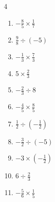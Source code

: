 \begin{multicols}{4}
\begin{enumerate}

\columnbreak %

\resetques

  \item $\displaystyle -\frac{8}{5}\times{}\frac{1}{7}$


  \item $\displaystyle \frac{9}{8}\div{}\left(-5\right)$


  \item $\displaystyle -\frac{1}{3}\times{}\frac{7}{3}$


  \item $\displaystyle 5\times{}\frac{2}{3}$


  \item $\displaystyle -\frac{2}{3}\div{}8$


  \item $\displaystyle -\frac{4}{5}\times{}\frac{8}{5}$


  \item $\displaystyle \frac{1}{2}\div{}\left(-\frac{1}{2}\right)$

        \phantom{$\displaystyle =-1$}

  \item $\displaystyle -\frac{3}{2}\div{}\left(-5\right)$


  \item $\displaystyle -3\times{}\left(-\frac{1}{2}\right)$


  \item $\displaystyle 6\div{}\frac{2}{3}$

        \phantom{$\displaystyle =9$}

\columnbreak %

  \item $\displaystyle -\frac{5}{6}\times{}\frac{1}{5}$


\end{enumerate}
\end{multicols}

